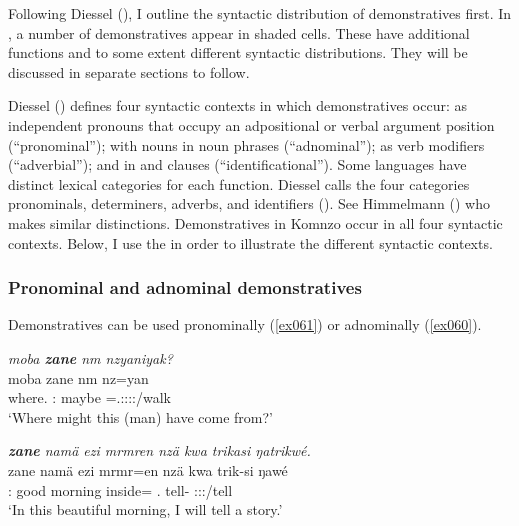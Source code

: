 \largerpage
Following Diessel (\citeyear{Diessel:2009tg}), I outline the syntactic distribution of demonstratives first. In , a number of demonstratives appear in shaded cells. These have additional functions and to some extent different syntactic distributions. They will be discussed in separate sections to follow.

 
Diessel (\citeyear{Diessel:2009tg}) defines four syntactic contexts in which demonstratives occur: as independent pronouns that occupy an adpositional or verbal argument position (``pronominal''); with nouns in noun phrases (``adnominal''); as verb modifiers (``adverbial''); and in  and  clauses (``identificational''). Some languages have distinct lexical categories for each function. Diessel calls the four categories  pronominals,  determiners,  adverbs, and  identifiers (\citeyear[3]{Diessel:2009tg}). See Himmelmann (\citeyear{Himmelmann:1996tp}) who makes similar distinctions. Demonstratives in Komnzo occur in all four syntactic contexts. Below, I use the  in order to illustrate the different syntactic contexts.
  

\subsubsection{Pronominal and adnominal demonstratives} \label{pronominal-demonstratives-subsec}

Demonstratives can be used pronominally (\ref{ex061}) or adnominally (\ref{ex060}).

\begin{exe}
	\ex \emph{moba \textbf{zane} nm nzyaniyak?}\\
	\gll moba zane nm nz=yan\\
	where.{\Abl} \Dem:{\Prox} maybe \Immpst=\Tsg.\Masc:\Sbj:\Nonpast:\Ipfv:\Venit/walk\\
	\trans `Where might this (man) have come from?' 
	\label{ex061}
\end{exe}
\begin{exe}
	\ex \emph{\textbf{zane} namä ezi mrmren nzä kwa trikasi ŋatrikwé.}\\
	\gll zane namä ezi mrmr=en nzä kwa trik-si ŋawé\\
	\Dem:{\Prox} good morning inside={\Loc} \Fsg.{\Abs} {\Fut} tell-{\Nmlz} \Fsg:\Sbj:\Nonpast:\Ipfv/tell\\
	\trans `In this beautiful morning, I will tell a story.' 
	\label{ex060}
\end{exe}


